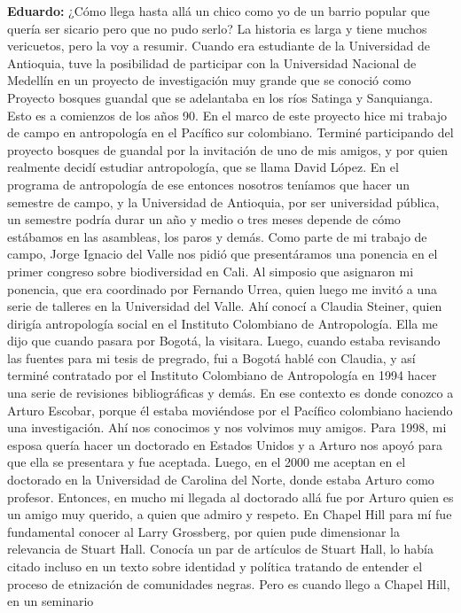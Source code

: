 \documentclass[
]{interact}
\begin{document}
\textbf{Eduardo:} ¿Cómo llega hasta allá un chico como yo de un barrio
popular que quería ser sicario pero que no pudo serlo? La historia es
larga y tiene muchos vericuetos, pero la voy a resumir. Cuando era
estudiante de la Universidad de Antioquia, tuve la posibilidad de
participar con la Universidad Nacional de Medellín en un proyecto de
investigación muy grande que se conoció como Proyecto bosques guandal
que se adelantaba en los ríos Satinga y Sanquianga. Esto es a comienzos
de los años 90. En el marco de este proyecto hice mi trabajo de campo en
antropología en el Pacífico sur colombiano. Terminé participando del
proyecto bosques de guandal por la invitación de uno de mis amigos, y
por quien realmente decidí estudiar antropología, que se llama David
López. En el programa de antropología de ese entonces nosotros teníamos
que hacer un semestre de campo, y la Universidad de Antioquia, por ser
universidad pública, un semestre podría durar un año y medio o tres
meses depende de cómo estábamos en las asambleas, los paros y demás.
Como parte de mi trabajo de campo, Jorge Ignacio del Valle nos pidió que
presentáramos una ponencia en el primer congreso sobre biodiversidad en
Cali. Al simposio que asignaron mi ponencia, que era coordinado por
Fernando Urrea, quien luego me invitó a una serie de talleres en la
Universidad del Valle. Ahí conocí a Claudia Steiner, quien dirigía
antropología social en el Instituto Colombiano de Antropología. Ella me
dijo que cuando pasara por Bogotá, la visitara. Luego, cuando estaba
revisando las fuentes para mi tesis de pregrado, fui a Bogotá hablé con
Claudia, y así terminé contratado por el Instituto Colombiano de
Antropología en 1994 hacer una serie de revisiones bibliográficas y
demás. En ese contexto es donde conozco a Arturo Escobar, porque él
estaba moviéndose por el Pacífico colombiano haciendo una investigación.
Ahí nos conocimos y nos volvimos muy amigos. Para 1998, mi esposa quería
hacer un doctorado en Estados Unidos y a Arturo nos apoyó para que ella
se presentara y fue aceptada. Luego, en el 2000 me aceptan en el
doctorado en la Universidad de Carolina del Norte, donde estaba Arturo
como profesor. Entonces, en mucho mi llegada al doctorado allá fue por
Arturo quien es un amigo muy querido, a quien que admiro y respeto. En
Chapel Hill para mí fue fundamental conocer al Larry Grossberg, por
quien pude dimensionar la relevancia de Stuart Hall. Conocía un par de
artículos de Stuart Hall, lo había citado incluso en un texto sobre
identidad y política tratando de entender el proceso de etnización de
comunidades negras. Pero es cuando llego a Chapel Hill, en un seminario
\end{document}
